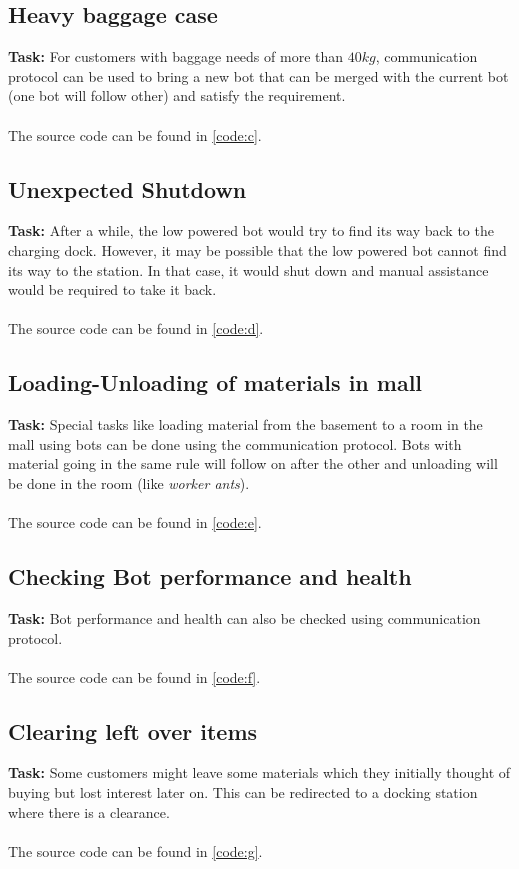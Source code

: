 \documentclass{article}
\begin{document}
\subsection{Heavy baggage case}
\textbf{Task: } For customers with baggage needs of more than $40kg$, communication protocol can be used to bring a new bot that can be merged with the current bot (one bot will follow other) and satisfy the requirement.
\\
\\
The source code can be found in \ref{code:c}.
\subsection{Unexpected Shutdown}
\textbf{Task: } After a while, the low powered bot would try to find its way back to the charging dock. However, it may be possible that the low powered bot cannot find its way to the station. In that case, it would shut down and manual assistance would be required to take it back.
\\
\\
The source code can be found in \ref{code:d}.
\subsection{Loading-Unloading of materials in mall}
\textbf{Task: } Special tasks like loading material from the basement to a room in the mall using bots can be done using the communication protocol. Bots with material going in the same rule will follow on after the other and unloading will be done in the room (like \textit{worker ants}).
\\
\\
The source code can be found in \ref{code:e}.
\subsection{Checking Bot performance and health}
\textbf{Task: } Bot performance and health can also be checked using communication protocol.
\\
\\
The source code can be found in \ref{code:f}.
\subsection{Clearing left over items}
\textbf{Task: } Some customers might leave some materials which they initially thought of buying but lost interest later on. This can be redirected to a docking station where there is a clearance.
\\
\\
The source code can be found in \ref{code:g}.
\end{document}
